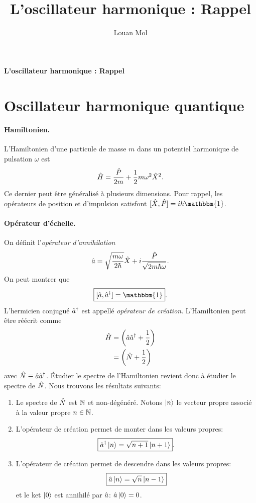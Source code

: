 \documentclass[11pt,a4paper,oneside]{article}
\title{L'oscillateur harmonique : Rappel}
\author{Louan Mol}
\begin{document}
\begin{center}
    {\huge \textbf{L'oscillateur harmonique : Rappel}}
\end{center}

\section{Oscillateur harmonique quantique}

\paragraph*{Hamiltonien.} L'Hamiltonien d'une particule de masse $m$ dans un potentiel harmonique de pulsation $\omega$ est
\begin{equation*}
    \hat{H} = \frac{\hat{P}}{2m}+\frac{1}{2}m\omega^2\hat{X}^2.
\end{equation*}
Ce dernier peut être généralisé à plusieurs dimensions. Pour rappel, les opérateurs de position et d'impulsion satisfont $[\hX,\hP]=i\hbar\mathbbm{1}$.

\paragraph*{Opérateur d'échelle.} On définit l'\emph{opérateur d'annihilation}
\begin{eqnarray}
    \hat{a} = \sqrt{\frac{m\omega}{2\hbar}}\hat{X}+i\frac{\hat{P}}{\sqrt{2m\hbar\omega}}.
\end{eqnarray}
On peut montrer que
\begin{equation*}
    \boxed{[\ha,\ha^\dagger]=\mathbbm{1}}.
\end{equation*}
L'hermicien conjugué $\hat{a}^\dagger$ est appellé \emph{opérateur de création}. L'Hamiltonien peut être réécrit comme
\begin{align}
    \hat{H} &= \left(\hat{a}\hat{a}^\dagger+\frac{1}{2}\right)\\
    &= \left(\hat{N}+\frac{1}{2}\right)
\end{align}
avec $\hat{N}\equiv\hat{a}\hat{a}^\dagger$. Étudier le spectre de l'Hamiltonien revient donc à étudier le spectre de $\hat{N}$. Nous trouvons les résultats suivants:
\begin{enumerate}[label=\roman*)]
    \item Le spectre de $\hat{N}$ est $\mathbb{N}$ et non-dégénéré. Notons $\ket{n}$ le vecteur propre associé à la valeur propre $n\in\mathbb{N}$.
    \item L'opérateur de création permet de monter dans les valeurs propres:
    \begin{equation*}
        \boxed{\hat{a}^\dagger\ket{n}=\sqrt{n+1}\ket{n+1}}.
    \end{equation*}
    \item L'opérateur de création permet de descendre dans les valeurs propres:
    \begin{equation*}
        \boxed{\hat{a}\ket{n}=\sqrt{n}\ket{n-1}}
    \end{equation*}
    et le ket $\ket{0}$ est annihilé par $\hat{a}$: $\hat{a}\ket{0}=0$.
\end{enumerate}
\end{document}
